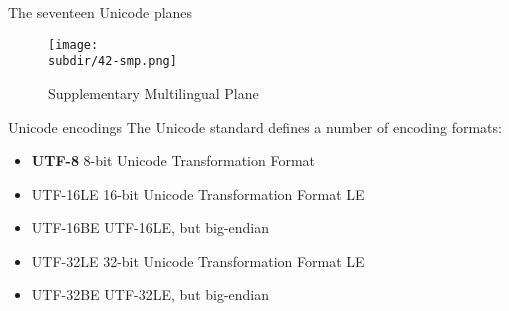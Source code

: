 \documentclass[../index.tex]{subfiles}
\begin{document}
\renewcommand{\currenttitle}{The seventeen Unicode planes}
\begin{frame}{\currenttitle}
%
  \vspace*{1em}
  \begin{figure}
    \centering
    \texttt{[image: \\subdir/42-smp.png]}
    \caption{Supplementary Multilingual Plane}
  \end{figure}
\end{frame}

\renewcommand{\currenttitle}{Unicode encodings}
\begin{frame}{\currenttitle}
%
%
%
%
%
  The Unicode standard defines a number of encoding formats:

  \begin{itemize}
    \item \textbf{UTF-8} \textendash{} 8-bit Unicode Transformation Format
    \item[] UTF-16LE \textendash{} 16-bit Unicode Transformation Format LE
    \item[] UTF-16BE \textendash{} UTF-16LE, but big-endian
    \item[] UTF-32LE \textendash{} 32-bit Unicode Transformation Format LE
    \item[] UTF-32BE \textendash{} UTF-32LE, but big-endian
  \end{itemize}
\end{frame}
\end{document}
